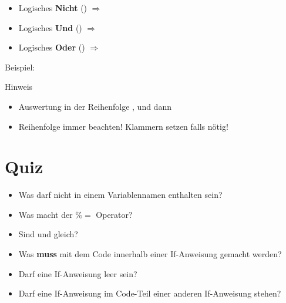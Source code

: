 \begin{frame}
	\slidehead
	\vspace{-0.1cm}
	\begin{itemize}
		\item Logisches \textbf{Nicht} ()  $\Rightarrow$ 
		\item Logisches \textbf{Und} () $\Rightarrow$ 
		\item Logisches \textbf{Oder} ()  $\Rightarrow$ 
	\end{itemize}
	\vspace{-0.15cm}
	\begin{block}{Beispiel:}
	\end{block}
	\vspace{-0.15cm}
	\begin{block}{Hinweis}
		\begin{itemize}
			\item Auswertung in der Reihenfolge ,  und dann 
			\item Reihenfolge immer beachten! Klammern setzen falls nötig!
		\end{itemize}
	\end{block}
\end{frame}

\livecoding

\section{Quiz}
\begin{frame}
	\slidehead
	\begin{itemize}
		\item Was darf nicht in einem Variablennamen enthalten sein?
		\pause
		\item Was macht der \textbf{$\%=$} Operator?%
		\pause
		\item Sind \pythoninline{=} und \pythoninline{==} gleich?
		\pause
		\item Was \textbf{muss} mit dem Code innerhalb einer If-Anweisung gemacht werden?
		\pause
		\item Darf eine If-Anweisung leer sein?
		\pause
		\item Darf eine If-Anweisung im Code-Teil einer anderen If-Anweisung stehen?
	\end{itemize}
\end{frame}




